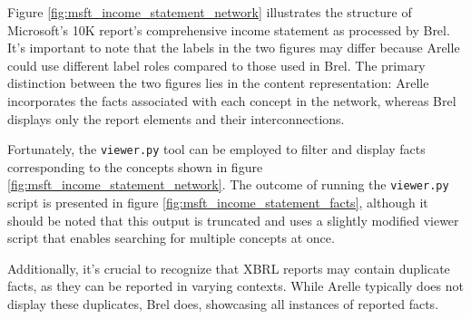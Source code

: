 

Figure \ref{fig:msft_income_statement_network} illustrates the structure of Microsoft's 10K report's comprehensive income statement as processed by Brel.  
It's important to note that the labels in the two figures may differ because Arelle could use different label roles compared to those used in Brel.  
The primary distinction between the two figures lies in the content representation: Arelle incorporates the facts associated with each concept in the network,  
whereas Brel displays only the report elements and their interconnections.

Fortunately, the \texttt{viewer.py} tool can be employed to filter and display facts corresponding to the concepts shown in figure \ref{fig:msft_income_statement_network}.  
The outcome of running the \texttt{viewer.py} script is presented in figure \ref{fig:msft_income_statement_facts},  
although it should be noted that this output is truncated and uses a slightly modified viewer script that enables searching for multiple concepts at once.

Additionally, it's crucial to recognize that XBRL reports may contain duplicate facts, as they can be reported in varying contexts.  
While Arelle typically does not display these duplicates, Brel does, showcasing all instances of reported facts.

